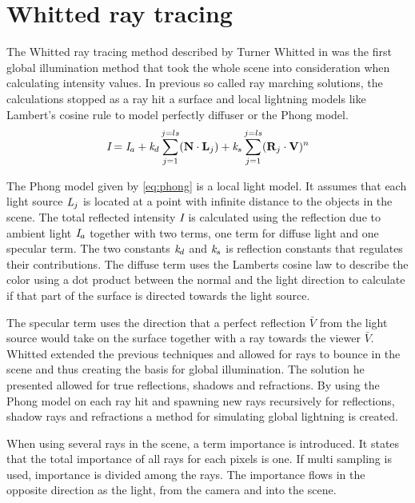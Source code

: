\documentclass[a4paper, 12pt]{report}
\begin{document}
\section{Whitted ray tracing}
The Whitted ray tracing method described by Turner Whitted in \cite{Foley_animproved} was the first global illumination method that took the whole scene into consideration when calculating intensity values.
In previous so called ray marching solutions, the calculations stopped as a ray hit a surface and local lightning models like Lambert's cosine rule to model perfectly diffuser or the Phong model. \\

\begin{equation} \label{eq:phong}
\emph{I} = \emph{I}_{a} + \emph{k}_{d} \sum_{j=1}^{j=ls} (  \mathbf{N} \cdot \mathbf{L}_j) + \emph{k}_{s} \sum_{j=1}^{j=ls} (  \mathbf{R}_j \cdot \mathbf{V})^n
\end{equation}

The Phong model given by \autoref{eq:phong} is a local light model.
It assumes that each light source $\emph{L}_j$ is located at a point with infinite distance to the objects in the scene. 
The total reflected intensity $\emph{I}$ is calculated using the reflection due to ambient light $\emph{I}_{a}$ together with two terms, one term for diffuse light and one specular term.
The two constants $\emph{k}_{d}$ and $\emph{k}_{s}$ is reflection constants that regulates their contributions.
The diffuse term uses the Lamberts cosine law to describe the color using a dot product between the normal and the light direction to calculate if that part of the surface is directed towards the light source.

The specular term uses the direction that a perfect reflection $ \bar{V} $ from the light source would take on the surface together with a ray towards the viewer $\bar{V}$.\\

Whitted extended the previous techniques and allowed for rays to bounce in the scene and thus creating the basis for global illumination.
The solution he presented allowed for true reflections, shadows and refractions.
By using the Phong model on each ray hit and spawning new rays recursively for reflections, shadow rays and refractions a method for simulating global lightning is created.

When using several rays in the scene, a term importance is introduced.
It states that the total importance of all rays for each pixels is one. 
If multi sampling is used, importance is divided among the rays.
The importance flows in the opposite direction as the light, from the camera and into the scene.
\end{document}
